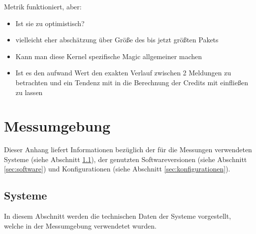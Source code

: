 \documentclass[a4paper, 12pt, BCOR10mm, DIV12, toc=bibliography, toc=listof, german]{scrbook}
\begin{document}
		Metrik funktioniert, aber:
		\begin{itemize}
			\item Ist sie zu optimistisch?
			\item vielleicht eher abschätzung über Größe des bis jetzt größten Pakets
			\item Kann man diese Kernel spezifische Magic allgemeiner machen
			\item Ist es den aufwand Wert den exakten Verlauf zwischen 2 Meldungen zu betrachten und ein
				Tendenz mit in die Berechnung der Credits mit einfließen zu lassen
		\end{itemize}
		



	\appendix

	\chapter{Messumgebung} %
	\label{cha:messumgebung}

	Dieser Anhang liefert Informationen bezüglich der für die Messungen verwendeten Systeme (siehe
	Abschnitt \ref{sec:Systeme}),
	der genutzten Softwareversionen (siehe Abschnitt \ref{sec:software}) und Konfigurationen
	(siehe Abschnitt \ref{sec:konfigurationen}).

		\section{Systeme} %
		\label{sec:Systeme}

			In diesem Abschnitt werden die technischen Daten der Systeme vorgestellt, welche in der
			Messumgebung verwendetet wurden.
\end{document}
